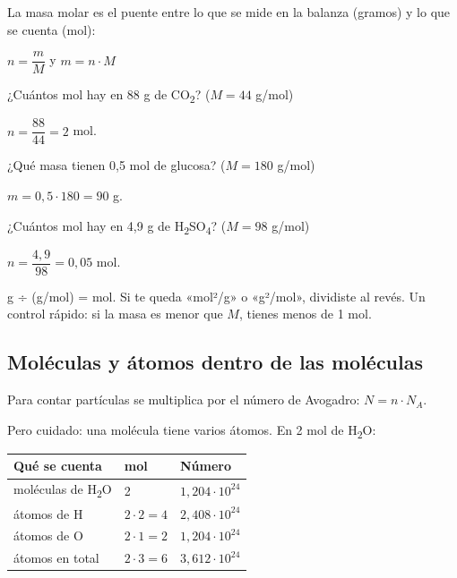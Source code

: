 La masa molar es el puente entre lo que se mide en la balanza (gramos) y lo que se cuenta (mol):

 
\begin{center}
$n = \dfrac{m}{M}$ y $m = n\cdot M$
\end{center}
  
\begin{ejemplo} ¿Cuántos mol hay en 88 g de CO\textsubscript{2}? ($M = 44$ g/mol)\par $n = \dfrac{88}{44} = 2$ mol.\end{ejemplo}
 
\begin{ejemplo} ¿Qué masa tienen 0,5 mol de glucosa? ($M = 180$ g/mol)\par $m = 0{,}5\cdot 180 = 90$ g.\end{ejemplo}
 
\begin{ejemplo} ¿Cuántos mol hay en 4,9 g de H\textsubscript{2}SO\textsubscript{4}? ($M = 98$ g/mol)\par $n = \dfrac{4{,}9}{98} = 0{,}05$ mol.\end{ejemplo}
 
\begin{ojo} g ÷ (g/mol) = mol. Si te queda «mol²/g» o «g²/mol», dividiste al revés. Un control rápido: si la masa es menor que $M$, tienes menos de 1 mol.\end{ojo}
\subsection{Moléculas y átomos dentro de las moléculas}
Para contar partículas se multiplica por el número de Avogadro: $N = n\cdot N_A$.

 

Pero cuidado: una molécula tiene varios átomos. En 2 mol de H\textsubscript{2}O:

 
\begin{center}\small
\begin{tabular}{@{}lll@{}}
\toprule
\textbf{Qué se cuenta} & \textbf{mol} & \textbf{Número} \\
\midrule
moléculas de H\textsubscript{2}O & 2 & $1{,}204\cdot 10^{24}$ \\
átomos de H & $2\cdot 2 = 4$ & $2{,}408\cdot 10^{24}$ \\
átomos de O & $2\cdot 1 = 2$ & $1{,}204\cdot 10^{24}$ \\
átomos en total & $2\cdot 3 = 6$ & $3{,}612\cdot 10^{24}$ \\
\bottomrule
\end{tabular}
\end{center}
  
